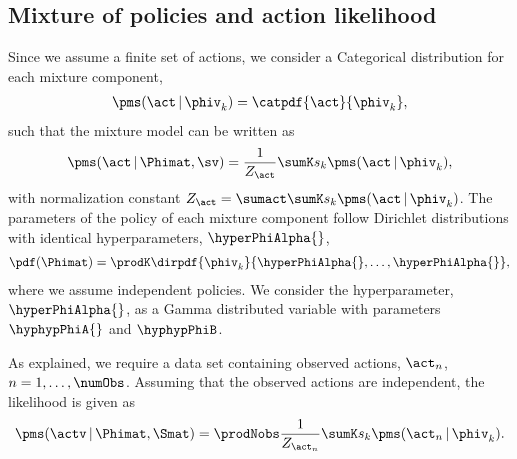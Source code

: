 \documentclass{article}
\begin{document}
\subsection{Mixture of policies and action likelihood}
Since we assume a finite set of actions, we consider a Categorical distribution for each mixture component, 
\begin{align*}
 \pms(\act\,|\,\phiv_k) = \catpdf{\act}{\phiv_k},
\end{align*}
such that the mixture model can be written as
\begin{align}
 \pms(\act \,|\,\Phimat,\sv) = \frac{1}{Z_\act} \sumK s_k \pms(\act\,|\,\phiv_k), 
 \label{eq::model::mixture}
\end{align}
with normalization constant $Z_\act = \sumact \sumK s_k \pms(\act\,|\,\phiv_k)$.
The parameters of the policy of each mixture component follow Dirichlet distributions with identical hyperparameters, $\hyperPhiAlpha{}$,
\begin{align*}
 \pdf(\Phimat) = \prodK \dirpdf{\phiv_k}{\hyperPhiAlpha{},\ldots,\hyperPhiAlpha{}},
\end{align*}
where we assume independent policies. 
We consider the hyperparameter, $\hyperPhiAlpha{}$, as a Gamma distributed variable with parameters $\hyphypPhiA{}$ and $\hyphypPhiB$. 

As explained, we require a data set containing observed actions, $\act_n$, $n=1,\ldots,\numObs$.
Assuming that the observed actions are independent, the likelihood is given as
\begin{align*}
 \pms(\actv \,|\,\Phimat,\Smat) =  \prodNobs \frac{1}{Z_{\act_n}} \sumK s_k \pms(\act_n\,|\,\phiv_k).
\end{align*}
\end{document}
